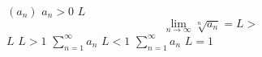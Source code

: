 \documentclass{article}
\begin{document}
$(a_n)$
$a_n > 0$
$L$
$$
  \lim_{n\to \infty}\sqrt[n]{a_n} = L
>$$
$L$
$L > 1$
$\displaystyle\sum_{n = 1}^{\infty}{a_n}$
$L < 1$
$\displaystyle\sum_{n = 1}^{\infty}{a_n}$
$L = 1$
\end{document}
